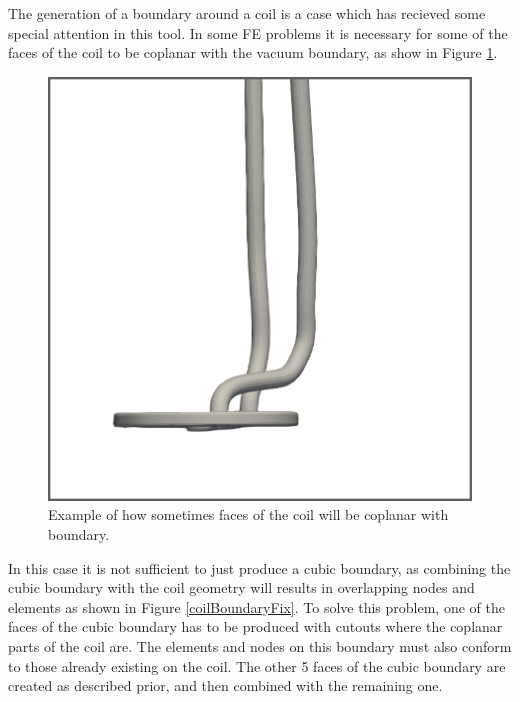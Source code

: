 \documentclass[12pt, letterpaper]{article}
\begin{document}
The generation of a boundary around a coil is a case which has recieved some special attention in this tool. In some FE problems it is necessary for some of the faces of the coil to be coplanar with the vacuum boundary, as show in Figure \ref{coplanarCoilFig}. 

\begin{figure}
\begin{center}
\includegraphics[width=0.5\linewidth]{coplanarCoil.png}
\end{center}
\caption{Example of how sometimes faces of the coil will be coplanar with boundary.}
\label{coplanarCoilFig}
\end{figure}

In this case it is not sufficient to just produce a cubic boundary, as combining the cubic boundary with the coil geometry will results in overlapping nodes and elements as shown in Figure \ref{coilBoundaryFix}. To solve this problem, one of the faces of the cubic boundary has to be produced with cutouts where the coplanar parts of the coil are. The elements and nodes on this boundary must also conform to those already existing on the coil. The other 5 faces of the cubic boundary are created as described prior, and then combined with the remaining one.
\end{document}
